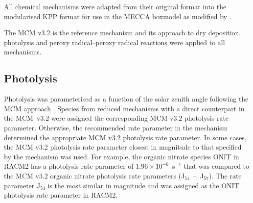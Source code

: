 All chemical mechanisms were adapted from their original format into the modularised KPP \citep{Damian:2002} format for use in the MECCA boxmodel \citep{Sander:2005} as modified by \citep{Butler:2011}.

The MCM v3.2 \citep{Jenkin:1997, Jenkin:2003, Saunders:2003, Bloss:2005, MCM_Site} is the reference mechanism and its approach to dry deposition, photolysis and peroxy radical--peroxy radical reactions were applied to all mechanisms. 

\subsection{Photolysis} \label{ss:photolysis}
Photolysis was parameterised as a function of the solar zenith angle following the MCM approach \citep{Saunders:2003}.
Species from reduced mechanisms with a direct counterpart in the \mbox{MCM v3.2} were assigned the corresponding MCM v3.2 photolysis rate parameter. 
Otherwise, the recommended rate parameter in the mechanism determined the appropriate MCM v3.2 photolysis rate parameter. 
In some cases, the MCM v3.2 photolysis rate parameter closest in magnitude to that specified by the mechanism was used.  
For example, the organic nitrate species ONIT in RACM2 has a photolysis rate parameter of \mbox{$1.96 \times 10^{-6}$ s$^{-1}$} that was compared to the MCM v3.2 organic nitrate photolysis rate parameters \mbox{(J$_{51}$ -- J$_{57}$)}. 
The rate parameter J$_{54}$ is the most similar in magnitude and was assigned as the ONIT photolysis rate parameter in RACM2.

